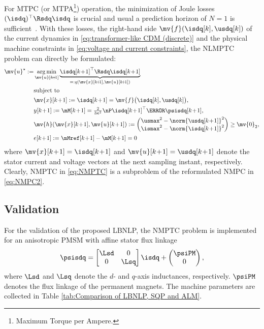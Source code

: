 \documentclass[journal]{IEEEtranTIE}
\begin{document}
For MTPC (or MTPA\footnote{Maximum Torque per Ampere.}) operation, the minimization of Joule losses $(\isdq)^\top\Rsdq\isdq$ is crucial and usual a prediction horizon of $N=1$ is sufficient~\cite{choi2023model,2017_Eldeeb_Aunifiedtheoryforoptimalfeedforwardtorquecontrolofanisotropicsynchronousmachines}. With these losses, the right-hand side $\mv{f}(\isdq[k],\usdq[k])$ of the current dynamics in \eqref{eq:transformer-like CDM (discrete)} and the physical machine constraints in \eqref{eq:voltage and current constraints}, the NLMPTC problem can directly be formulated:
%
\begin{subequations}
\label{eq:NMPTC}
\begin{align}
\mv{u}^\star:=&\mathop {\rm arg\min }\limits_{\mv{u}[k\!+\!1]}  \underbrace{\isdq[k\!+\!1]^\top\Rsdq\isdq[k\!+\!1]}_{=:q(\mv{x}[k\!+\!1],\mv{u}[k\!+\!1])} \\
\nonumber
&{\rm{subject\ to}}\\
&\mv{x}[k\!+\!1] := \isdq[k\!+\!1] = \mv{f}\big( \isdq[k] ,\usdq[k] \big), \\ 
&y[k\!+\!1] := \mM[k\!+\!1] = \tfrac{2}{3\kappa^2}\nP \isdq[k\!+\!1]^\top\J \psisdq[k\!+\!1],\\ %
&\mv{h}(\mv{x}[k\!+\!1],\mv{u}[k\!+\!1]) := \begin{pmatrix}\usmax^2 - \norm{\usdq[k\!+\!1]}^2\\ \ismax^2 - \norm{\isdq[k\!+\!1]}^2  \end{pmatrix} \geq \mv{0}_2, \\
&e[k\!+\!1] := \mMref[k\!+\!1] - \mM[k\!+\!1] = 0 \label{eq:NMPC2 final e}
\end{align}
\end{subequations}
%
where $\mv{x}[k\!+\!1]=\isdq[k\!+\!1]$ and $\mv{u}[k\!+\!1]=\usdq[k\!+\!1]$ denote the stator current and voltage vectors at the next sampling instant, respectively.
Clearly, NMPTC in \eqref{eq:NMPTC} is a subproblem of the reformulated NMPC in \eqref{eq:NMPC2}.

\subsection{Validation}\label{subsec:val}
For the validation of the proposed LBNLP, the NMPTC problem is implemented for an anisotropic PMSM with affine stator flux linkage
$$
\psisdq = \begin{bmatrix} \Lsd & 0 \\ 0 & \Lsq \end{bmatrix}\isdq + \begin{pmatrix} \psiPM \\ 0 \end{pmatrix},
$$
where $\Lsd$ and $\Lsq$ denote the $d$- and $q$-axis inductances, respectively. $\psiPM$ denotes the flux linkage of the permanent magnets. The machine parameters are collected in Table \ref{tab:Comparison of LBNLP, SQP and ALM}. 
\end{document}
